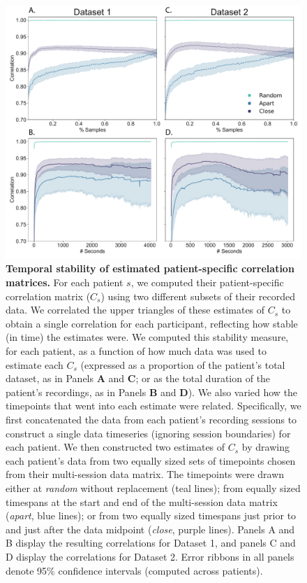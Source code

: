 \documentclass[10pt]{article}
\begin{document}
\begin{figure}[p]
\centering \includegraphics[width=\textwidth]{figs/supplemental_7}
\caption{\textbf{Temporal stability of estimated patient-specific correlation
matrices.}  For each patient $s$, we computed their patient-specific correlation
matrix ($C_s$) using two different subsets of their recorded data.  We
correlated the upper triangles of these estimates of $C_s$ to obtain a single
correlation for each participant, reflecting how stable (in time) the estimates
were.  We computed this stability measure, for each patient, as a function of
how much data was used to estimate each $C_s$ (expressed as a proportion of the
patient's total dataset, as in Panels \textbf{A} and \textbf{C}; or as the total duration of the
patient's recordings, as in Panels \textbf{B} and \textbf{D}).  We also varied how the timepoints
that went into each estimate were related. Specifically, we first concatenated the data from each patient's recording sessions to
construct a single data timeseries (ignoring session boundaries) for each patient.  We then constructed two
estimates of $C_s$ by drawing each patient's data from two equally sized sets of timepoints chosen from their multi-session data matrix.
The timepoints were drawn either at \textit{random} without replacement (teal lines); from equally sized timespans at the start and end of the multi-session data matrix (\textit{apart}, blue lines); or from two equally sized timespans just prior to and just after the data midpoint (\textit{close}, purple lines).  Panels A and B display the resulting correlations for Dataset 1, and panels C and D display the correlations for Dataset 2.
Error ribbons in all panels denote 95\% confidence intervals (computed across patients).}
\label{fig:supplemental_7}
\end{figure}
\end{document}

